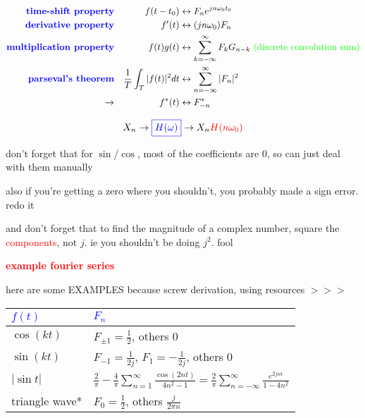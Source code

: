 \documentclass[a5paper, fleqn]{article}
\newcommand{\vocab}[1]{\textbf{\textcolor{blue}{#1}}}
\newcommand{\heading}[1]{\textbf{\textcolor{red}{#1}}}
\newcommand{\emf}[1]{\textcolor{red}{#1}}
\newcommand{\note}[1]{\textcolor{green}{#1}}
\newcommand{\wrap}{\hangpara{0.5cm}{1}}
\begin{document}
\begin{align*}
  \vocab{time-shift property}     &  & f(t - t_0)                     & \leftrightarrow F_n e^{jn\omega_0 t_0}                                                             \\
  \vocab{derivative property}     &  & f^\prime(t)                    & \leftrightarrow (jn\omega_0)F_n                                                                    \\
  \vocab{multiplication property} &  & f(t) g(t)                      & \leftrightarrow \sum_{k = -\infty}^\infty F_k G_{n - k} ~ \note{\text{(discrete convolution sum)}} \\
  \vocab{parseval's theorem}      &  & \frac{1}{T} \int_T |f(t)|^2 dt & \leftrightarrow \sum_{n = -\infty}^\infty |F_n|^2                                                  \\
  \to                             &  & f^*(t)                         & \leftrightarrow F^*_{-n}
\end{align*}

\[X_n \to \vocab{$\boxed{H(\omega)}$} \to X_n \emf{H(n\omega_0)}\]

don't forget that for $\sin$/$\cos$, most of the coefficients are 0, so can just deal with them manually

also if you're getting a zero where you shouldn't, you probably made a sign error. redo it

\wrap and don't forget that to find the magnitude of a complex number, square the \emf{components}, not $j$. ie you shouldn't be doing $j^2$. fool

\heading{example fourier series}

here are some EXAMPLES because screw derivation, using resources $>>>$

\begin{tabular}{l | l}
  \vocab{$f(t)$} & \vocab{$F_n$}                                                                                                                                      \\
  \hline
  $\cos (kt)$    & $F_{\pm 1} = \frac{1}{2}$, others $0$                                                                                                              \\
  $\sin (kt)$    & $F_{-1} = \frac{1}{2j}$, $F_1 = -\frac{1}{2j}$, others $0$                                                                                         \\
  $|\sin t|$     & $\frac{2}{\pi} - \frac{4}{\pi} \sum_{n = 1}^\infty \frac{\cos(2nt)}{4n^2 - 1} = \frac{2}{\pi} \sum_{n = -\infty}^\infty \frac{e^{2jnt}}{1 - 4n^2}$ \\
  triangle wave* & $F_0 = \frac{1}{2}$, others $\frac{j}{2\pi n}$
\end{tabular}
\end{document}
